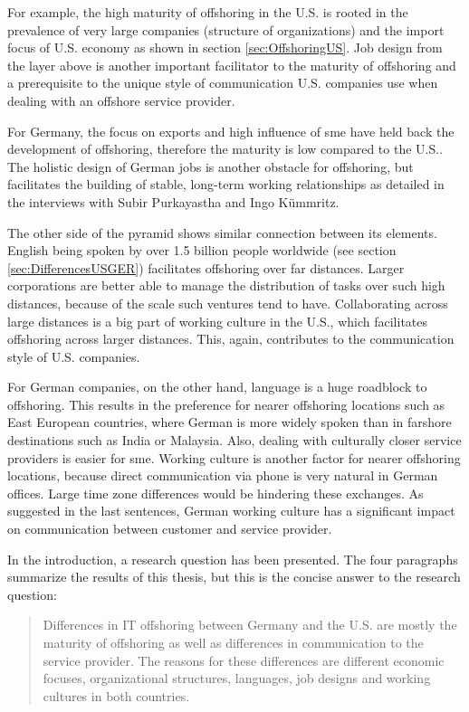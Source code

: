 For example, the high maturity of offshoring in the U.S. is rooted in the prevalence of very large companies (structure of organizations) and the import focus of U.S. economy as shown in section \ref{sec:OffshoringUS}. Job design from the layer above is another important facilitator to the maturity of offshoring and a prerequisite to the unique style of communication U.S. companies use when dealing with an offshore service provider.

For Germany, the focus on exports and high influence of \gls{sme} have held back the development of offshoring, therefore the maturity is low compared to the U.S.. The holistic design of German jobs is another obstacle for offshoring, but facilitates the building of stable, long-term working relationships as detailed in the interviews with Subir Purkayastha and Ingo K\"ummritz.

The other side of the pyramid shows similar connection between its elements. English being spoken by over 1.5 billion people worldwide (see section \ref{sec:DifferencesUSGER}) facilitates offshoring over far distances. Larger corporations are better able to manage the distribution of tasks over such high distances, because of the scale such ventures tend to have. Collaborating across large distances is a big part of working culture in the U.S., which facilitates offshoring across larger distances. This, again, contributes to the communication style of U.S. companies.

For German companies, on the other hand, language is a huge roadblock to offshoring. This results in the preference for nearer offshoring locations such as East European countries, where German is more widely spoken than in farshore destinations such as India or Malaysia. Also, dealing with culturally closer service providers is easier for \gls{sme}. Working culture is another factor for nearer offshoring locations, because direct communication via phone is very natural in German offices. Large time zone differences would be hindering these exchanges. As suggested in the last sentences, German working culture has a significant impact on communication between customer and service provider.

In the introduction, a research question has been presented. The four paragraphs summarize the results of this thesis, but this is the concise answer to the research question:

\begin{quote}
	\centering
	Differences in IT offshoring between Germany and the U.S. are mostly the maturity of offshoring as well as differences in communication to the service provider. The reasons for these differences are different economic focuses, organizational structures, languages, job designs and working cultures in both countries.
\end{quote}


